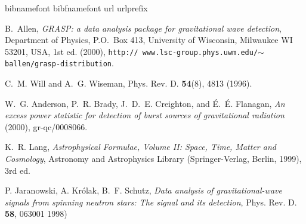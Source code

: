 \newpage
\newpage
\newpage
\newpage
\newpage
\newpage
\newpage
\newpage
\newpage
\newpage
\newpage

\newpage\begin{thebibliography}{1}
\expandafter\ifx\csname bibnamefont\endcsname\relax
  \def\bibnamefont#1{#1}\fi
\expandafter\ifx\csname bibfnamefont\endcsname\relax
  \def\bibfnamefont#1{#1}\fi
\expandafter\ifx\csname url\endcsname\relax
  \def\url#1{\texttt{#1}}\fi
\expandafter\ifx\csname urlprefix\endcsname\relax\def\urlprefix{URL }\fi
\providecommand{\bibinfo}[2]{#2}
\providecommand{\eprint}[2][]{\url{#2}}

\bibinfo{author}{\bibfnamefont{B.}~\bibnamefont{Allen}},
  \emph{\bibinfo{title}{GRASP: a data analysis package for gravitational wave
  detection}}, \bibinfo{address}{Department of Physics, P.O.\ Box 413,
  University of Wisconsin, Milwaukee WI 53201, USA}, \bibinfo{edition}{1st} ed.
  (\bibinfo{year}{2000}), \bibinfo{note}{\texttt{http:\slash\slash
  www.lsc-group.phys.uwm.edu\slash$\sim$ballen\slash grasp-distribution}}.

\bibinfo{author}{\bibfnamefont{C.~M.} \bibnamefont{Will}} \bibnamefont{and}
  \bibinfo{author}{\bibfnamefont{A.~G.} \bibnamefont{Wiseman}},
  \bibinfo{journal}{Phys. Rev. D.}
  \textbf{\bibinfo{volume}{54}}(\bibinfo{number}{8}), \bibinfo{pages}{4813}
  (\bibinfo{year}{1996}).

\bibinfo{author}{\bibfnamefont{W.~G.} \bibnamefont{Anderson}},
  \bibinfo{author}{\bibfnamefont{P.~R.} \bibnamefont{Brady}},
  \bibinfo{author}{\bibfnamefont{J.~D.~E.} \bibnamefont{Creighton}},
  \bibnamefont{and} \bibinfo{author}{\bibfnamefont{\'E.~\'E.}
  \bibnamefont{Flanagan}}, \emph{\bibinfo{title}{An excess power statistic for
  detection of burst sources of gravitational radiation}}
  (\bibinfo{year}{2000}), \bibinfo{note}{gr-qc/0008066}.

\bibinfo{author}{\bibfnamefont{K.~R.} \bibnamefont{Lang}},
  \emph{\bibinfo{title}{Astrophysical Formulae, Volume II: Space, Time, Matter
  and Cosmology}}, Astronomy and Astrophysics Library
  (\bibinfo{publisher}{Springer-Verlag}, \bibinfo{address}{Berlin},
  \bibinfo{year}{1999}), \bibinfo{edition}{3rd} ed.

\bibinfo{author}{\bibfnamefont{P.} \bibnamefont{Jaranowski}},
\bibinfo{author}{\bibfnamefont{A.} \bibnamefont{Kr\'olak}},
\bibinfo{author}{\bibfnamefont{B.~F.} \bibnamefont{Schutz}},
  \emph{\bibinfo{title}{Data analysis of gravitational-wave signals
      from spinning neutron stars: The signal and its detection}}, 
  \bibinfo{journal}{Phys. Rev. D.}
  \textbf{\bibinfo{volume}{58}}, \bibinfo{pages}{063001}
  \bibinfo{year}{1998})


\end{thebibliography}
